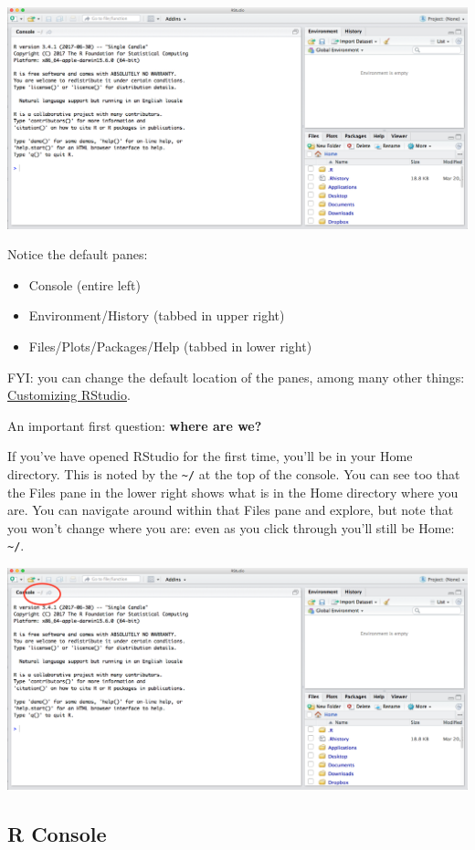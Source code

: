 \documentclass[]{book}
\providecommand{\tightlist}{%
  \setlength{\itemsep}{0pt}\setlength{\parskip}{0pt}}
\begin{document}
\includegraphics[width=0.8\linewidth]{img/RStudio_IDE}

Notice the default panes:

\begin{itemize}
\tightlist
\item
  Console (entire left)
\item
  Environment/History (tabbed in upper right)
\item
  Files/Plots/Packages/Help (tabbed in lower right)
\end{itemize}

FYI: you can change the default location of the panes, among many other things: \href{https://support.rstudio.com/hc/en-us/articles/200549016-Customizing-RStudio}{Customizing RStudio}.

An important first question: \textbf{where are we?}

If you've have opened RStudio for the first time, you'll be in your Home directory. This is noted by the \texttt{\textasciitilde{}/} at the top of the console. You can see too that the Files pane in the lower right shows what is in the Home directory where you are. You can navigate around within that Files pane and explore, but note that you won't change where you are: even as you click through you'll still be Home: \texttt{\textasciitilde{}/}.

\includegraphics[width=0.8\linewidth]{img/RStudio_IDE_homedir}

\hypertarget{r-console}{%
\subsection{R Console}\label{r-console}}
\end{document}
